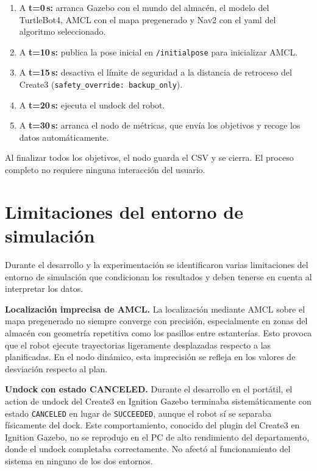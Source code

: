 \begin{enumerate}
    \item A \textbf{t=0\,s:} arranca Gazebo con el mundo del almacén, el modelo del TurtleBot4, AMCL con el mapa pregenerado y Nav2 con el yaml del algoritmo seleccionado.
    \item A \textbf{t=10\,s:} publica la pose inicial en \texttt{/initialpose} para inicializar AMCL.
    \item A \textbf{t=15\,s:} desactiva el límite de seguridad a la distancia de retroceso del Create3 (\texttt{safety\_override: backup\_only}).
    \item A \textbf{t=20\,s:} ejecuta el undock del robot.
    \item A \textbf{t=30\,s:} arranca el nodo de métricas, que envía los objetivos y recoge los datos automáticamente.
\end{enumerate}

Al finalizar todos los objetivos, el nodo guarda el CSV y se cierra. El proceso completo no requiere ninguna interacción del usuario.

\section{Limitaciones del entorno de simulación}
\label{sec:limitaciones_simulacion}

Durante el desarrollo y la experimentación se identificaron varias limitaciones del entorno de simulación que condicionan los resultados y deben tenerse en cuenta al interpretar los datos.

\textbf{Localización imprecisa de AMCL.} La localización mediante AMCL sobre el mapa pregenerado no siempre converge con precisión, especialmente en zonas del almacén con geometría repetitiva como los pasillos entre estanterías. Esto provoca que el robot ejecute trayectorias ligeramente desplazadas respecto a las planificadas. En el nodo dinámico, esta imprecisión se refleja en los valores de desviación respecto al plan.

\textbf{Undock con estado CANCELED.} Durante el desarrollo en el portátil, el action de undock del Create3 en Ignition Gazebo terminaba sistemáticamente con estado \texttt{CANCELED} en lugar de \texttt{SUCCEEDED}, aunque el robot sí se separaba físicamente del dock. Este comportamiento, conocido del plugin del Create3 en Ignition Gazebo, no se reprodujo en el PC de alto rendimiento del departamento, donde el undock completaba correctamente. No afectó al funcionamiento del sistema en ninguno de los dos entornos.

